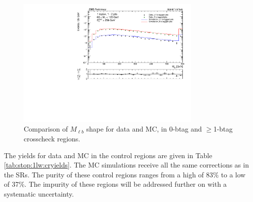 \begin{figure}[htbp]
\centering
\includegraphics[width=0.8\textwidth]{figures/cr0b_Mlbshape_crosscheck.pdf}
\caption{Comparison of $M_{\ell b}$ shape for data and MC, in 0-btag
  and $\geq$1-btag crosscheck regions.}
\label{fig:stop:1lw:mlbxcheck}
\end{figure}

The yields for data and MC in the control regions are given in Table
\ref{tab:stop:1lw:cryields}. The MC simulations receive all the same
corrections as in the SRs. The purity of these control regions ranges
from a high of 83\% to a low of 37\%. The impurity of these regions
will be addressed further on with a systematic uncertainty.

